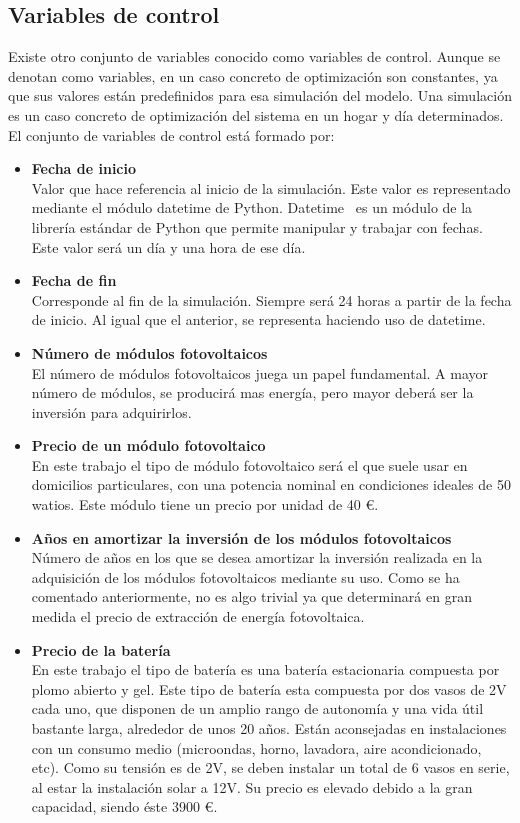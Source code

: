 \subsection{Variables de control}
Existe otro conjunto de variables conocido como variables de control. Aunque se denotan como variables, en un caso concreto de optimización son constantes, ya que sus valores están predefinidos para esa simulación del modelo. Una simulación es un caso concreto de optimización del sistema en un hogar y día determinados. El conjunto de variables de control está formado por:
\begin{itemize}
	\item \textbf{Fecha de inicio}\\ Valor que hace referencia al inicio de la simulación. Este valor es representado mediante el módulo datetime de Python. Datetime~\cite{Dtpy} es un módulo de la librería estándar de Python que permite manipular y trabajar con fechas. Este valor será un día y una hora de ese día.
	\item \textbf{Fecha de fin}\\ Corresponde al fin de la simulación. Siempre será 24 horas a partir de la fecha de inicio. Al igual que el anterior, se representa haciendo uso de datetime.
	\item \textbf{Número de módulos fotovoltaicos}\\ El número de módulos fotovoltaicos juega un papel fundamental. A mayor número de módulos, se producirá mas energía, pero mayor deberá ser la inversión para adquirirlos.
	\item \textbf{Precio de un módulo fotovoltaico}\\ En este trabajo el tipo de módulo fotovoltaico será el que suele usar en domicilios particulares, con una potencia nominal en condiciones ideales de 50 watios. Este módulo tiene un precio por unidad de 40 €.
	\item \textbf{Años en amortizar la inversión de los módulos fotovoltaicos}\\ Número de años en los que se desea amortizar la inversión realizada en la adquisición de los módulos fotovoltaicos mediante su uso. Como se ha comentado anteriormente, no es algo trivial ya que determinará en gran medida el precio de extracción de energía fotovoltaica.
	\item \textbf{Precio de la batería}\\ En este trabajo el tipo de batería es una batería estacionaria compuesta por plomo abierto y gel. Este tipo de batería esta compuesta por dos vasos de 2V cada uno, que disponen de un amplio rango de autonomía y una vida útil bastante larga, alrededor de unos 20 años. Están aconsejadas en instalaciones con un consumo medio (microondas, horno, lavadora, aire acondicionado, etc). Como su tensión es de 2V, se deben instalar un total de 6 vasos en serie, al estar la instalación solar a 12V. Su precio es elevado debido a la gran capacidad, siendo éste 3900 €.

\end{itemize}

